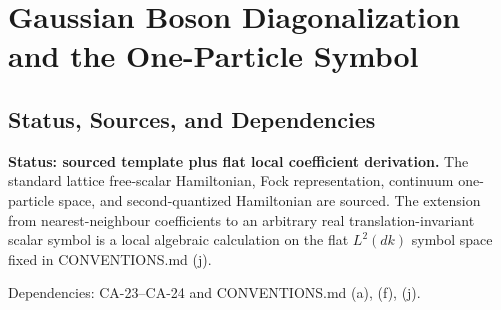 
\section{Gaussian Boson Diagonalization and the One-Particle Symbol}
\label{sec:gaussian-boson-diagonalization}

\subsection{Status, Sources, and Dependencies}

\textbf{Status: sourced template plus flat local coefficient derivation.}  The
standard lattice free-scalar Hamiltonian, Fock representation, continuum
one-particle space, and second-quantized Hamiltonian are sourced.  The extension
from nearest-neighbour coefficients to an arbitrary real translation-invariant
scalar symbol is a local algebraic calculation on the flat \(L^2(dk)\) symbol
space fixed in CONVENTIONS.md (j).

Dependencies: CA-23--CA-24 and CONVENTIONS.md (a), (f), (j).


